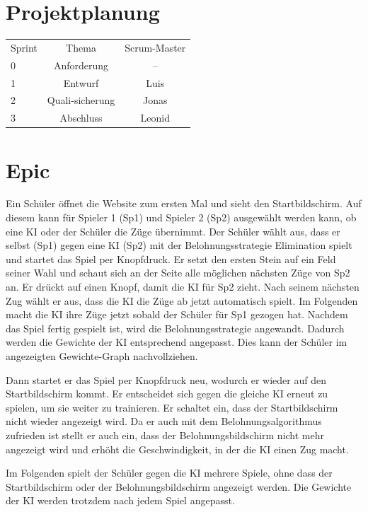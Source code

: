 \documentclass[titlepage]{scrartcl}
\begin{document}
\section{Projektplanung}%
\begin{tabular}{lcc}
	Sprint &Thema& Scrum-Master\\
	0&Anforderung&--\\
	1&Entwurf & Luis\\
	2&Quali-sicherung & Jonas \\
	3&Abschluss & Leonid\\
\end{tabular}


\section{Epic}

Ein Schüler öffnet die Website zum ersten Mal und sieht den Startbildschirm.
Auf diesem kann für Spieler 1 (Sp1) und Spieler 2 (Sp2) ausgewählt werden kann, ob eine KI oder der Schüler die Züge übernimmt.
Der Schüler wählt aus, dass er selbst (Sp1) gegen eine KI (Sp2) mit der Belohnungsstrategie Elimination spielt und startet das Spiel per Knopfdruck.
Er setzt den ersten Stein auf ein Feld seiner Wahl und schaut sich an der Seite alle möglichen nächsten Züge von Sp2 an.
Er drückt auf einen Knopf, damit die KI für Sp2 zieht.
Nach seinem nächsten Zug wählt er aus, dass die KI die Züge ab jetzt automatisch spielt.
Im Folgenden macht die KI ihre Züge jetzt sobald der Schüler für Sp1 gezogen hat.
Nachdem das Spiel fertig gespielt ist, wird die Belohnungsstrategie angewandt.
Dadurch werden die Gewichte der KI entsprechend angepasst.
Dies kann der Schüler im angezeigten Gewichte-Graph nachvollziehen.

Dann startet er das Spiel per Knopfdruck neu, wodurch er wieder auf den Startbildschirm kommt.
Er entscheidet sich gegen die gleiche KI erneut zu spielen, um sie weiter zu trainieren.
Er schaltet ein, dass der Startbildschirm nicht wieder angezeigt wird.
Da er auch mit dem Belohnungsalgorithmus zufrieden ist stellt er auch ein, dass der Belohnungsbildschirm nicht mehr angezeigt wird und erhöht die Geschwindigkeit, in der die KI einen Zug macht.

Im Folgenden spielt der Schüler gegen die KI mehrere Spiele, ohne dass der Startbildschirm oder der Belohnungsbildschirm angezeigt werden.
Die Gewichte der KI werden trotzdem nach jedem Spiel angepasst.
\end{document}

